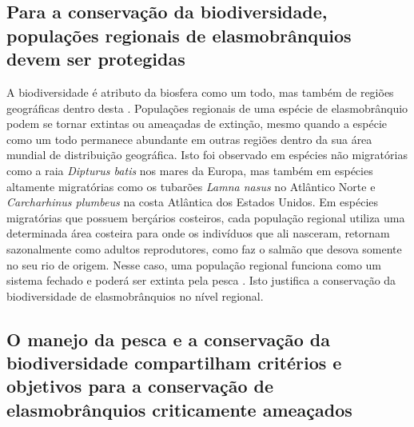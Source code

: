 \documentclass[a4paper,11pt,twoside,showtrims,onecolumn,openright,final]{memoir}
\begin{document}
\subsection*{Para a conservação da biodiversidade, 
             populações regionais de elasmobrânquios devem ser protegidas}

A biodiversidade é atributo da biosfera como um todo, mas também de 
regiões geográficas dentro desta \citep{houaiss2001}. %
Populações regionais de uma espécie de elasmobrânquio podem se tornar extintas ou ameaçadas 
de extinção, mesmo quando a espécie como um todo permanece abundante em outras regiões dentro 
da sua área mundial de distribuição geográfica. Isto foi observado em espécies não migratórias 
como a raia \emph{Dipturus batis} nos mares da Europa, mas também em espécies altamente migratórias 
como os tubarões \emph{Lamna nasus} no Atlântico Norte e \emph{Carcharhinus plumbeus} na costa Atlântica 
dos Estados Unidos. Em espécies migratórias que possuem berçários costeiros, cada população regional 
utiliza uma determinada área costeira para onde os indivíduos que ali nasceram, retornam sazonalmente como 
adultos reprodutores, como faz o salmão que desova somente no seu rio de origem. Nesse caso, uma população 
regional funciona como um sistema fechado e poderá ser extinta pela pesca
\citep{camhi1998,dulvy2003}. %
Isto justifica a conservação da biodiversidade de elasmobrânquios no nível regional. 

\subsection*{O manejo da pesca e a conservação da biodiversidade compartilham critérios 
             e objetivos para a conservação de elasmobrânquios criticamente ameaçados}
\end{document}
